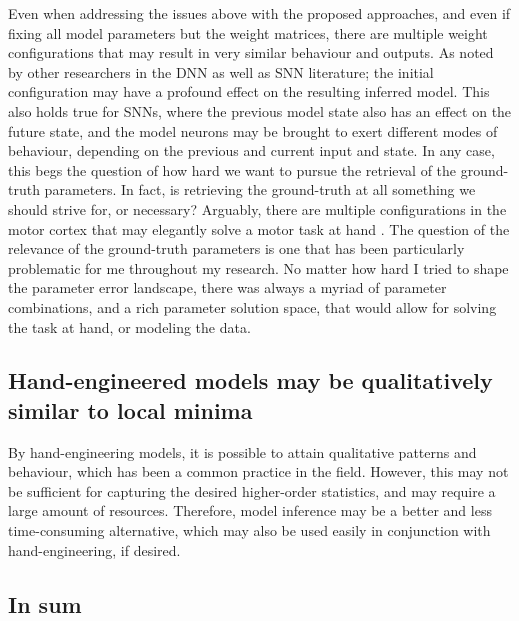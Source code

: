 \documentclass[mphil,deptreport,ianc]{infthesis} %
\begin{document}
Even when addressing the issues above with the proposed approaches, and even if fixing all model parameters but the weight matrices, there are multiple weight configurations that may result in very similar behaviour and outputs.
As noted by other researchers in the DNN as well as SNN literature; the initial configuration may have a profound effect on the resulting inferred model. 
This also holds true for SNNs, where the previous model state also has an effect on the future state, and the model neurons may be brought to exert different modes of behaviour, depending on the previous and current input and state.
In any case, this begs the question of how hard we want to pursue the retrieval of the ground-truth parameters. 
In fact, is retrieving the ground-truth at all something we should strive for, or necessary?
Arguably, there are multiple configurations in the motor cortex that may elegantly solve a motor task at hand \cite{Marblestone2016}.
The question of the relevance of the ground-truth parameters is one that has been particularly problematic for me throughout my research. No matter how hard I tried to shape the parameter error landscape, there was always a myriad of parameter combinations, and a rich parameter solution space, that would allow for solving the task at hand, or modeling the data.


\subsection*{Hand-engineered models may be qualitatively similar to local minima}

By hand-engineering models, it is possible to attain qualitative patterns and behaviour, which has been a common practice in the field. 
However, this may not be sufficient for capturing the desired higher-order statistics, and may require a large amount of resources. 
Therefore, model inference may be a better and less time-consuming alternative, which may also be used easily in conjunction with hand-engineering, if desired. 


\subsection*{In sum}
\end{document}
